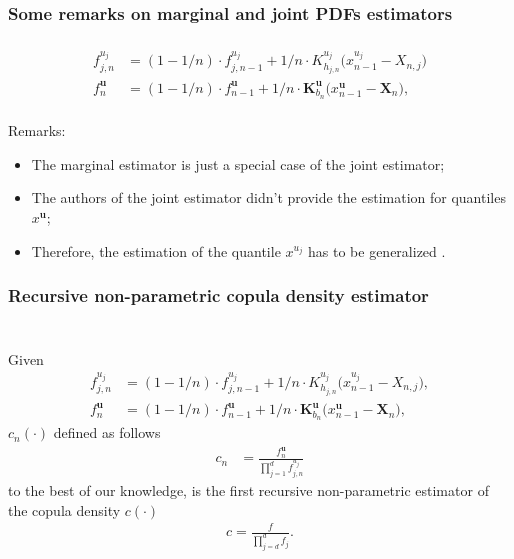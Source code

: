 \documentclass[aspectratio=169]{beamer}
\begin{document}
			
		\subsubsection{Some remarks on marginal and joint PDFs estimators}
			\begin{frame}
				\frametitle{\insertsubsubsection}
				
				\begin{align}
					f^{u_j}_{j, n} &= (1- 1/n) \cdot f^{u_j}_{j, n-1} + 1/n \cdot K^{u_j}_{h_{j, n}}\big(x^{u_j}_{n-1} - X_{n, j}\big) \\
					f^{\mathbf{u}}_n &= (1- 1/n) \cdot f^{\mathbf{u}}_{n-1} + 1/n \cdot \mathbf{K}_{b_n}^{\mathbf{u}} \big(x_{n-1}^{\mathbf{u}} - \mathbf{X}_n\big),
				\end{align}\\[1em]
				
				Remarks:
				\begin{itemize}
					\item<2-> The marginal estimator is just a special case of the joint estimator;
					\item<2-> The authors of the joint estimator didn't provide the estimation for quantiles $ x^{\mathbf{u}} $;
					\item<2-> Therefore, the estimation of the quantile $ x^{u_j} $ has to be generalized .
				\end{itemize}
				
			\end{frame}
			
		\subsubsection{Recursive non-parametric copula density estimator}
			\begin{frame}
				\frametitle{\insertsubsubsection}
				~\\
				Given
				\begin{align}
					f^{u_j}_{j, n} &= (1- 1/n) \cdot f^{u_j}_{j, n-1} + 1/n \cdot K^{u_j}_{h_{j, n}}\big(x^{u_j}_{n-1} - X_{n, j}\big), \\
					f^{\mathbf{u}}_n &= (1- 1/n) \cdot f^{\mathbf{u}}_{n-1} + 1/n \cdot \mathbf{K}_{b_n}^{\mathbf{u}} \big(x_{n-1}^{\mathbf{u}} - \mathbf{X}_n\big),
				\end{align}
				$ c_n(\cdot) $ defined as follows
				\begin{align}
					c_n &= \frac{f^{\mathbf{u}}_n}{\prod_{j=1}^{d}f^{u_j}_{j, n}}
				\end{align}
				to the best of our knowledge, is the first recursive non-parametric estimator of the copula density $ c(\cdot) $\\[-4ex]
				\begin{align}
					c = \frac{f}{\prod_{j=d}^{d}f_j}.
				\end{align}
				
			\end{frame}
	
\end{document}
